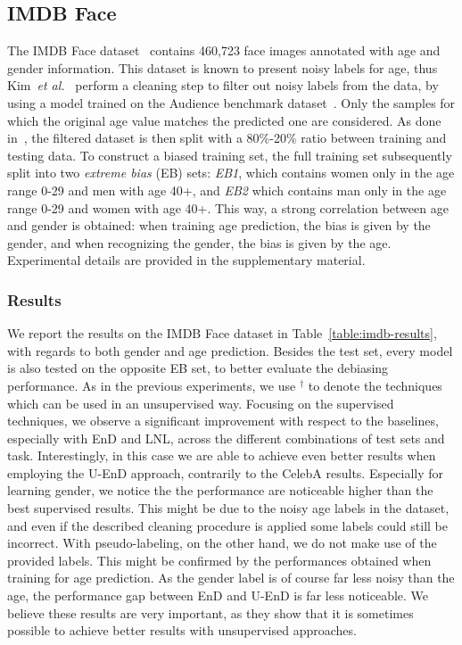 \subsection{IMDB Face}
The IMDB Face dataset~\cite{Rothe-IJCV-2018} contains 460,723 face images annotated with age and gender information. This dataset is known to present noisy labels for age, thus Kim~\emph{et al.}~\cite{Kim_2019_CVPR} perform a cleaning step to filter out noisy labels from the data, by using a model trained on the Audience benchmark dataset~\cite{eidinger2014age}. Only the samples for which the original age value matches the predicted one are considered. As done in~\cite{Kim_2019_CVPR}, the filtered dataset is then split with a 80\%-20\% ratio between training and testing data. To construct a biased training set, the full training set subsequently  split into two \emph{extreme bias} (EB) sets: \emph{EB1}, which contains women only in the age range 0-29 and men with age 40+, and \emph{EB2} which contains man only in the age range 0-29 and women with age 40+. This way, a strong correlation between age and gender is obtained: when training age prediction, the bias is given by the gender, and when recognizing the gender, the bias is given by the age. 
Experimental details are provided in the supplementary material. %


\subsubsection{Results}
We report the results on the IMDB Face dataset in Table~\ref{table:imdb-results}, with regards to both gender and age prediction. Besides the test set, every model is also tested on the opposite EB set, to better evaluate the debiasing performance. As in the previous experiments, we use $^\dagger$ to denote the techniques which can be used in an unsupervised way. Focusing on the supervised techniques, we observe a significant improvement with respect to the baselines, especially with EnD and LNL, across the different combinations of test sets and task. Interestingly, in this case we are able to achieve even better results when employing the U-EnD approach, contrarily to the CelebA results. Especially for learning gender, we notice the the performance are noticeable higher than the best supervised results. This might be due to the noisy age labels in the dataset, and even if the described cleaning procedure is applied some labels could still be incorrect. With pseudo-labeling, on the other hand, we do not make use of the provided labels. This might be confirmed by the performances obtained when training for age prediction. As the gender label is of course far less noisy than the age, the performance gap between EnD and U-EnD is far less noticeable. We believe these results are very important, as they show that it is sometimes possible to achieve better results with unsupervised approaches.

